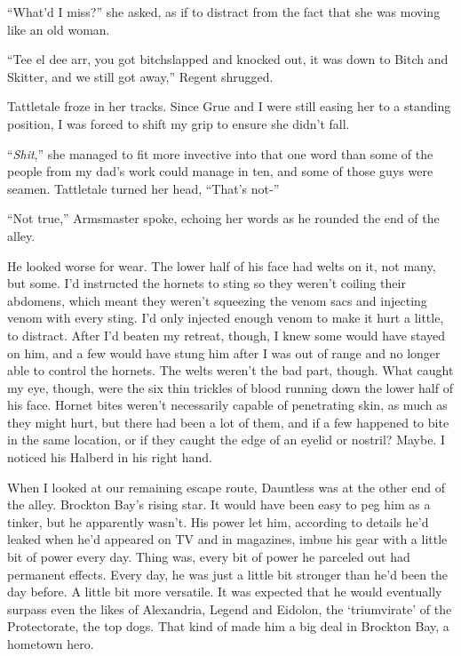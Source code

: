 ``What'd I miss?'' she asked, as if to distract from the fact that she was moving like an old woman.



``Tee el dee arr, you got bitchslapped and knocked out, it was down to Bitch and Skitter, and we still got away,'' Regent shrugged.



Tattletale froze in her tracks.  Since Grue and I were still easing her to a standing position, I was forced to shift my grip to ensure she didn't fall.



``\emph{Shit},'' she managed to fit more invective into that one word than some of the people from my dad's work could manage in ten, and some of those guys were seamen. Tattletale turned her head, ``That's not-''



``Not true,'' Armsmaster spoke, echoing her words as he rounded the end of the alley.



He looked worse for wear.  The lower half of his face had welts on it, not many, but some.  I'd instructed the hornets to sting so they weren't coiling their abdomens, which meant they weren't squeezing the venom sacs and injecting venom with every sting.  I'd only injected enough venom to make it hurt a little, to distract.  After I'd beaten my retreat, though, I knew some would have stayed on him, and a few would have stung him after I was out of range and no longer able to control the hornets.  The welts weren't the bad part, though.  What caught my eye, though, were the six thin trickles of blood running down the lower half of his face.  Hornet bites weren't necessarily capable of penetrating skin, as much as they might hurt, but there had been a lot of them, and if a few happened to bite in the same location, or if they caught the edge of an eyelid or nostril?  Maybe.  I noticed his Halberd in his right hand.



When I looked at our remaining escape route, Dauntless was at the other end of the alley.  Brockton Bay's rising star.  It would have been easy to peg him as a tinker, but he apparently wasn't.  His power let him, according to details he'd leaked when he'd appeared on TV and in magazines, imbue his gear with a little bit of power every day.  Thing was, every bit of power he parceled out had permanent effects.  Every day, he was just a little bit stronger than he'd been the day before.  A little bit more versatile.  It was expected that he would eventually surpass even the likes of Alexandria, Legend and Eidolon, the `triumvirate' of the Protectorate, the top dogs.  That kind of made him a big deal in Brockton Bay, a hometown hero.



